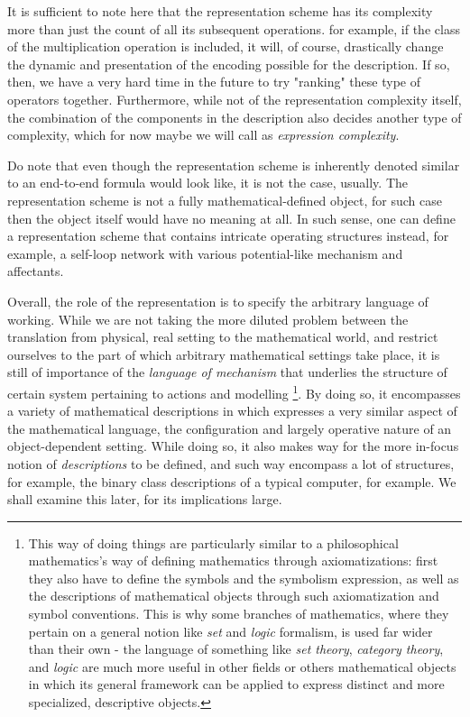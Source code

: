 \begin{note}
    It is sufficient to note here that the representation scheme has its complexity more than just the count of all its subsequent operations. for example, if the class of the multiplication operation is included, it will, of course, drastically change the dynamic and presentation of the encoding possible for the description. If so, then, we have a very hard time in the future to try "ranking" these type of operators together. Furthermore, while not of the representation complexity itself, the combination of the components in the description also decides another type of complexity, which for now maybe we will call as \textit{expression complexity}. 
\end{note}

Do note that even though the representation scheme is inherently denoted similar to an end-to-end formula would look like, it is not the case, usually. The representation scheme is not a fully mathematical-defined object, for such case then the object itself would have no meaning at all. In such sense, one can define a representation scheme that contains intricate operating structures instead, for example, a self-loop network with various potential-like mechanism and affectants. 


Overall, the role of the representation is to specify the arbitrary language of working. While we are not taking the more diluted problem between the translation from physical, real setting to the mathematical world, and restrict ourselves to the part of which arbitrary mathematical settings take place, it is still of importance of the \textit{language of mechanism} that underlies the structure of certain system pertaining to actions and modelling  \footnote{This way of doing things are particularly similar to a philosophical mathematics's way of defining mathematics through axiomatizations: first they also have to define the symbols and the symbolism expression, as well as the descriptions of mathematical objects through such axiomatization and symbol conventions. This is why some branches of mathematics, where they pertain on a general notion like \textit{set} and \textit{logic} formalism, is used far wider than their own - the language of something like \textit{set theory}, \textit{category theory}, and \textit{logic} are much more useful in other fields or others mathematical objects in which its general framework can be applied to express distinct and more specialized, descriptive objects.}. By doing so, it encompasses a variety of mathematical descriptions in which expresses a very similar aspect of the mathematical language, the configuration and largely operative nature of an object-dependent setting. While doing so, it also makes way for the more in-focus notion of \textit{descriptions} to be defined, and such way encompass a lot of structures, for example, the binary class descriptions of a typical computer, for example. We shall examine this later, for its implications large.

